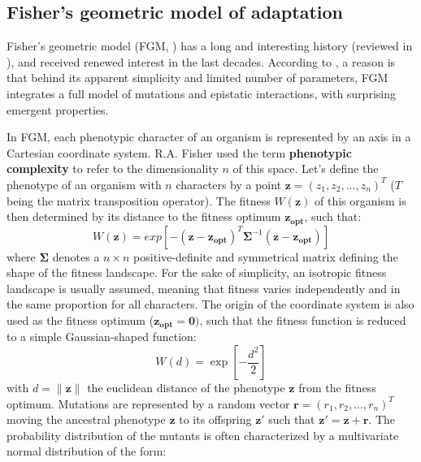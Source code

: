 
\subsection{Fisher's geometric model of adaptation}

Fisher's geometric model (FGM, \citealt{fisher-1930}) has a long and interesting history (reviewed in \citealt{orr-2005,tenaillon-2014}), and received renewed interest in the last decades. According to \cite{tenaillon-2014}, a reason is that behind its apparent simplicity and limited number of parameters, FGM integrates a full model of mutations and epistatic interactions, with surprising emergent properties.

In FGM, each phenotypic character of an organism is represented by an axis in a Cartesian coordinate system. R.A. Fisher used the term \textbf{phenotypic complexity} to refer to the dimensionality $n$ of this space. Let's define the phenotype of an organism with $n$ characters by a point $\boldsymbol{z} = (z_1, z_2, ..., z_n)^T$ ($T$ being the matrix transposition operator). The fitness $W(\boldsymbol{z})$ of this organism is then determined by its distance to the fitness optimum $\boldsymbol{z_{opt}}$, such that:
\begin{equation}
W(\boldsymbol{z}) = exp \left[ -(\boldsymbol{z}-\boldsymbol{z_{opt}})^T \boldsymbol{\Sigma}^{-1} (\boldsymbol{z}-\boldsymbol{z_{opt}})\right]
\end{equation}
where $\boldsymbol{\Sigma}$ denotes a $n \times n$ positive-definite and symmetrical matrix defining the shape of the fitness landscape. For the sake of simplicity, an isotropic fitness landscape is usually assumed, meaning that fitness varies independently and in the same proportion for all characters. The origin of the coordinate system is also used as the fitness optimum ($\boldsymbol{z_{opt}} = \boldsymbol{0})$, such that the fitness function is reduced to a simple Gaussian-shaped function:
\begin{equation}
W(d) = \exp \left[ -\dfrac{d^2}{2} \right]
\label{eq:fitness_function}
\end{equation}
with $d = \lVert \boldsymbol{z} \rVert$ the euclidean distance of the phenotype $\boldsymbol{z}$ from the fitness optimum. Mutations are represented by a random vector $\boldsymbol{r} = (r_1, r_2, ..., r_n)^T$ moving the ancestral phenotype $\boldsymbol{z}$ to its offspring $\boldsymbol{z'}$ such that $\boldsymbol{z'}=\boldsymbol{z}+\boldsymbol{r}$. The probability distribution of the mutants is often characterized by a multivariate normal distribution of the form:
